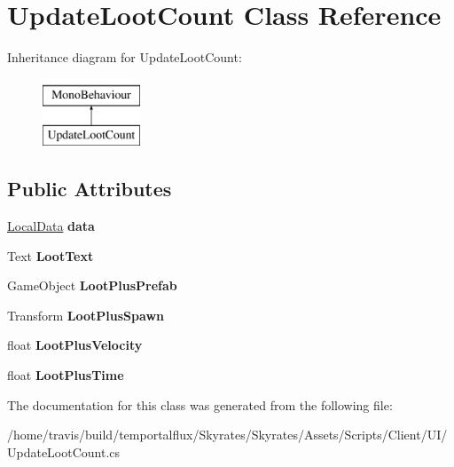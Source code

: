 \hypertarget{class_update_loot_count}{\section{Update\-Loot\-Count Class Reference}
\label{class_update_loot_count}
}
Inheritance diagram for Update\-Loot\-Count\-:\begin{figure}[H]
\begin{center}
\leavevmode
\includegraphics[height=2.000000cm]{class_update_loot_count}
\end{center}
\end{figure}
\subsection*{Public Attributes}
\begin{DoxyCompactItemize}
\item 
\hypertarget{class_update_loot_count_a6ef9556cf95dd8e588ba2868d756196f}{\hyperlink{class_local_data}{Local\-Data} {\bfseries data}}\label{class_update_loot_count_a6ef9556cf95dd8e588ba2868d756196f}

\item 
\hypertarget{class_update_loot_count_a66ef1fc818e702ba3272d51f59420837}{Text {\bfseries Loot\-Text}}\label{class_update_loot_count_a66ef1fc818e702ba3272d51f59420837}

\item 
\hypertarget{class_update_loot_count_a17a0feb1a09f4a8e6e8167dfbe8ffe5f}{Game\-Object {\bfseries Loot\-Plus\-Prefab}}\label{class_update_loot_count_a17a0feb1a09f4a8e6e8167dfbe8ffe5f}

\item 
\hypertarget{class_update_loot_count_aa486b65519bc7e53f414b8b811e5ad7d}{Transform {\bfseries Loot\-Plus\-Spawn}}\label{class_update_loot_count_aa486b65519bc7e53f414b8b811e5ad7d}

\item 
\hypertarget{class_update_loot_count_a2f8ecd465052802cd5a178d417313491}{float {\bfseries Loot\-Plus\-Velocity}}\label{class_update_loot_count_a2f8ecd465052802cd5a178d417313491}

\item 
\hypertarget{class_update_loot_count_a2ad3f5d3101ac566d513ec5f4dfd5a1a}{float {\bfseries Loot\-Plus\-Time}}\label{class_update_loot_count_a2ad3f5d3101ac566d513ec5f4dfd5a1a}

\end{DoxyCompactItemize}


The documentation for this class was generated from the following file\-:\begin{DoxyCompactItemize}
\item 
/home/travis/build/temportalflux/\-Skyrates/\-Skyrates/\-Assets/\-Scripts/\-Client/\-U\-I/Update\-Loot\-Count.\-cs\end{DoxyCompactItemize}
